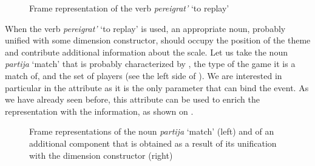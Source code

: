 \begin{figure}
\centering
{}
\caption{Frame representation of the verb \textit{pereigrat'} `to replay' \label{frame:pere:igrat}}
\end{figure}

When the verb \textit{pereigrat'} `to replay' is used, an appropriate noun, probably unified with some dimension constructor, should occupy the position of the theme and contribute additional information about the scale. Let us take the noun \textit{partija} `match' that is probably characterized by , the type of the game it is a match of, and the set of players (see the left side of ). We are interested in particular in the \DURATION attribute as it is the only parameter that can bind the event. As we have already seen before, this attribute can be used to enrich the representation with the  information, as shown on .

\begin{figure}\small
\hfill%
\caption{Frame representations of the noun \textit{partija} `match' (left) and of an additional component that is obtained as a result of its unification with the dimension constructor (right) \label{frame:match}}
\end{figure}

